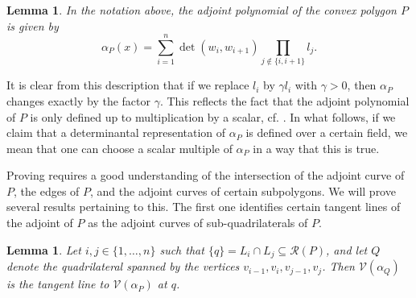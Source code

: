 \documentclass[a4paper,10pt]{amsart}
\theoremstyle{definition}
\theoremstyle{plain}
\newtheorem{lem}[Def]{Lemma}
\newcommand{\cR}{{\mathcal R}}
\newcommand{\cV}{{\mathcal V}}
\begin{document}
\begin{lem}
    In the notation above, the adjoint polynomial of the convex polygon $P$ is given by
    \begin{equation} \label{eq:adjpol_expl}
        \alpha_P(x) = \sum_{i = 1}^n \det(w_i, w_{i+1}) \prod_{j \not\in\{ i, i+1\}} l_j.
    \end{equation}
\end{lem}

It is clear from this description that if we replace $l_i$ by $\gamma l_i$ with $\gamma >0$, then $\alpha_P$ changes exactly by the factor $\gamma$. This reflects the fact that the adjoint polynomial of $P$ is only defined up to multiplication by a scalar, cf. . In what follows, if we claim that a determinantal representation of $\alpha_P$ is defined over a certain field, we mean that one can choose a scalar multiple of $\alpha_P$ in a way that this is true.

Proving  requires a good understanding of the intersection of the adjoint curve of $P$, the edges of $P$, and the adjoint curves of certain subpolygons. We will prove several results pertaining to this. The first one identifies certain tangent lines of the adjoint of $P$ as the adjoint curves of sub-quadrilaterals of $P$.
\begin{lem} \label{lem:AdjTangent}
    Let $i,j\in\{1,\ldots,n\}$ such that $\{q\} = L_i \cap L_j\subseteq\cR(P)$, and let $Q$ denote the quadrilateral spanned by the vertices $v_{i-1}, v_i, v_{j-1}, v_j$. Then $\cV(\alpha_{Q})$ is the tangent line to $\cV(\alpha_P)$ at $q$.
\end{lem}
\end{document}

